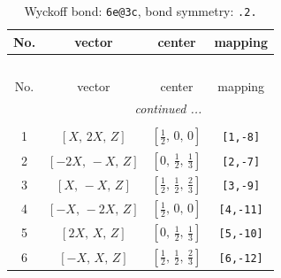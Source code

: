 \documentclass[fleqn,8pt]{jsarticle}
\begin{document}
\renewcommand{\arraystretch}{1.2}
\begin{longtable}{cccc}
\caption{Wyckoff bond: {\tt 6e@3c}, bond symmetry: {\tt .2.}}
 \\
 \hline \hline
No. & vector & center & mapping \\ \hline \endfirsthead

\multicolumn{3}{l}{\tablename\ \thetable{}} \\
 \hline \hline
No. & vector & center & mapping \\ \hline \endhead

 \hline \hline
\multicolumn{3}{r}{\footnotesize\it continued ...} \\ \endfoot

 \hline \hline
\multicolumn{3}{r}{} \\ \endlastfoot

1 & $\left[ X,\, 2 X,\, Z \right]$ & $\left[ \frac{1}{2},\, 0,\, 0 \right]$ & {\tt [1,-8]} \\ \hline
2 & $\left[ - 2 X,\, - X,\, Z \right]$ & $\left[ 0,\, \frac{1}{2},\, \frac{1}{3} \right]$ & {\tt [2,-7]} \\ \hline
3 & $\left[ X,\, - X,\, Z \right]$ & $\left[ \frac{1}{2},\, \frac{1}{2},\, \frac{2}{3} \right]$ & {\tt [3,-9]} \\ \hline
4 & $\left[ - X,\, - 2 X,\, Z \right]$ & $\left[ \frac{1}{2},\, 0,\, 0 \right]$ & {\tt [4,-11]} \\ \hline
5 & $\left[ 2 X,\, X,\, Z \right]$ & $\left[ 0,\, \frac{1}{2},\, \frac{1}{3} \right]$ & {\tt [5,-10]} \\ \hline
6 & $\left[ - X,\, X,\, Z \right]$ & $\left[ \frac{1}{2},\, \frac{1}{2},\, \frac{2}{3} \right]$ & {\tt [6,-12]} \\
\end{longtable}
\renewcommand{\arraystretch}{1.2}
\end{document}
